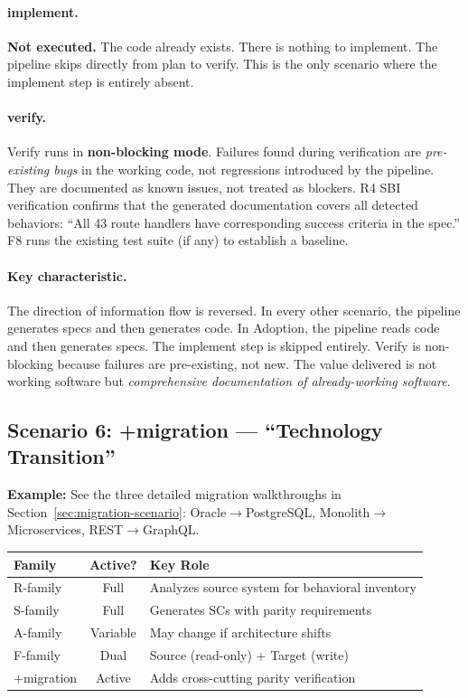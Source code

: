 \documentclass[11pt,a4paper,openright,twoside]{report}
\begin{document}
\paragraph{implement.}
\textbf{Not executed.} The code already exists. There is nothing to implement. The pipeline skips directly from plan to verify. This is the only scenario where the implement step is entirely absent.

\paragraph{verify.}
Verify runs in \textbf{non-blocking mode}. Failures found during verification are \emph{pre-existing bugs} in the working code, not regressions introduced by the pipeline. They are documented as known issues, not treated as blockers. R4 SBI verification confirms that the generated documentation covers all detected behaviors: ``All 43 route handlers have corresponding success criteria in the spec.'' F8 runs the existing test suite (if any) to establish a baseline.

\paragraph{Key characteristic.}
The direction of information flow is reversed. In every other scenario, the pipeline generates specs and then generates code. In Adoption, the pipeline reads code and then generates specs. The implement step is skipped entirely. Verify is non-blocking because failures are pre-existing, not new. The value delivered is not working software but \emph{comprehensive documentation of already-working software}.

\subsection{Scenario 6: +migration --- ``Technology Transition''}
\label{sec:scenario-migration}

\textbf{Example:} See the three detailed migration walkthroughs in Section~\ref{sec:migration-scenario}: Oracle$\to$PostgreSQL, Monolith$\to$Microservices, REST$\to$GraphQL.

\begin{center}
\begin{tabular}{lcp{8cm}}
\toprule
\textbf{Family} & \textbf{Active?} & \textbf{Key Role} \\
\midrule
R-family & Full & Analyzes source system for behavioral inventory \\
S-family & Full & Generates SCs with parity requirements \\
A-family & Variable & May change if architecture shifts \\
F-family & Dual & Source (read-only) + Target (write) \\
+migration & Active & Adds cross-cutting parity verification \\
\bottomrule
\end{tabular}
\end{center}
\end{document}
